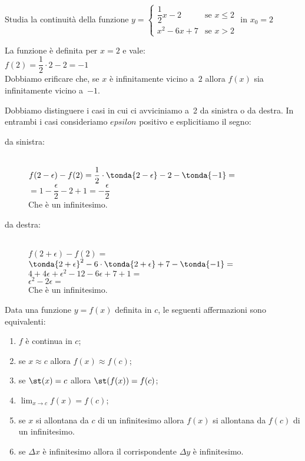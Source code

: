 \begin{esempio}
Studia la continuità della funzione 
\(y=\begin{cases} 
    \dfrac{1}{2}x-2 & \mbox{se }x \leqslant 2 \\ 
    x^2-6x+7 & \mbox{se }x > 2
  \end{cases}\)
\quad in \(x_0=2\)

La funzione è definita per \(x=2\) e vale:\\
\(f(2) = \dfrac{1}{2} \cdot 2-2 = -1\)\\
Dobbiamo  erificare che, se \(x\) è infinitamente vicino a~\(2\) allora 
\(f(x)\) sia infinitamente vicino a~\(-1\).

\begin{minipage}{.49\textwidth}
Dobbiamo distinguere i casi in cui ci avviciniamo a~2 da sinistra o da 
destra. In entrambi i casi consideriamo \(epsilon\) positivo e esplicitiamo 
il segno:
\begin{description}
 \item [da sinistra:]
 ~\\
\(f(2-\epsilon) - f(2) =
  \dfrac{1}{2} \cdot \tonda{2-\epsilon}-2-\tonda{-1} =\)\\
\(= 1 - \dfrac{\epsilon}{2} -2 +1 = -\dfrac{\epsilon}{2}\)\\
Che è un infinitesimo.
 \item [da destra:]
 ~\\
\(f(2+\epsilon) - f(2) =\)\\
\(\tonda{2+\epsilon}^2-6 \cdot \tonda{2+\epsilon}+7-\tonda{-1} =\)\\
\(4+4\epsilon+\epsilon^2-12-6 \epsilon+7+1 =\)\\
\(\epsilon^2-2 \epsilon =\)\\
Che è un infinitesimo.
\end{description}
\end{minipage}
\begin{minipage}{.49\textwidth}
\begin{center}\continuitagraficoa\end{center}
\end{minipage}

\end{esempio}

Data una funzione \(y=f(x)\) definita in \(c\), le seguenti 
affermazioni sono equivalenti:

\begin{enumerate}[noitemsep]
 \item \(f\) è continua in \(c\);
 \item se \(x \approx c\) allora \(f(x) \approx f(c)\);
 \item se \(\st(x) = c\) allora \(\st(f(x)) = f(c)\);
 \item \(\lim_{x \to c} f(x) = f(c)\);
 \item se \(x\) si allontana da \(c\) di un infinitesimo allora 
   \(f(x)\) si allontana da \(f(c)\) di un infinitesimo.
 \item se \(\Delta x\) è infinitesimo allora il corrispondente \(\Delta y\) 
   è infinitesimo.
\end{enumerate}

